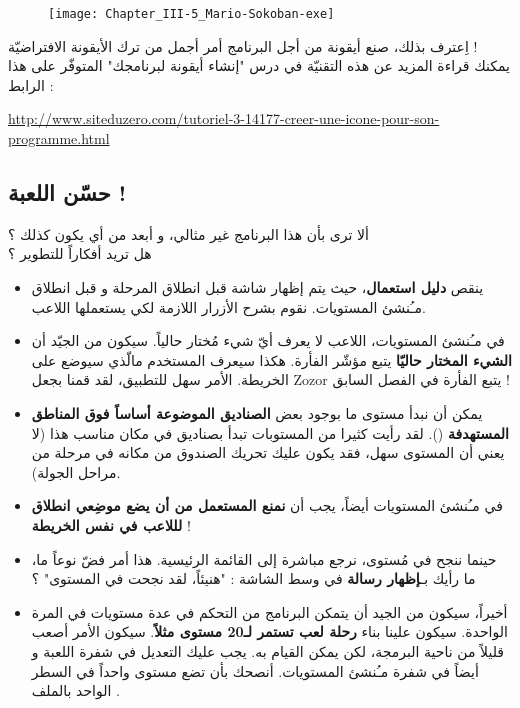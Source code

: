 \begin{figure}[H]
	\centering
	\texttt{[image: Chapter\_III-5\_Mario-Sokoban-exe]}
\end{figure}

اِعترف بذلك، صنع أيقونة من أجل البرنامج أمر أجمل من ترك الأيقونة الافتراضيّة !\\
يمكنك قراءة المزيد عن هذه التقنيّة في درس "إنشاء أيقونة لبرنامجك" المتوفّر على هذا الرابط :

\url{http://www.siteduzero.com/tutoriel-3-14177-creer-une-icone-pour-son-programme.html}

\subsection{حسّن اللعبة !}

ألا ترى بأن هذا البرنامج غير مثالي، و أبعد من أي يكون كذلك ؟\\
هل تريد أفكاراً للتطوير ؟

\begin{itemize}
	\item ينقص
	\textbf{دليل استعمال}،
	حيث يتم إظهار شاشة قبل انطلاق المرحلة و قبل انطلاق مـُنشئ المستويات. نقوم بشرح الأزرار اللازمة لكي يستعملها اللاعب.
	\item في مـُنشئ المستويات، اللاعب لا يعرف أيّ شيء مُختار حالياً. سيكون من الجيّد أن 
	\textbf{الشيء المختار حاليّا}
	يتبع مؤشّر الفأرة. هكذا سيعرف المستخدم مالّذي سيوضع على الخريطة. الأمر سهل للتطبيق، لقد قمنا بجعل
	\textenglish{Zozor}
	يتبع الفأرة في الفصل السابق !
	\item يمكن أن نبدأ مستوى ما بوجود بعض
	\textbf{الصناديق الموضوعة أساساً فوق المناطق المستهدفة}
	().
	لقد رأيت كثيرا من المستوبات تبدأ بصناديق في مكان مناسب هذا (لا يعني أن المستوى سهل، فقد يكون عليك تحريك الصندوق من مكانه في مرحلة من مراحل الجولة).
	\item في مـُنشئ المستويات أيضاً، يجب أن
	\textbf{نمنع المستعمل من أن يضع موضِعي انطلاق لللاعب في نفس الخريطة} !
	\item حينما ننجح في مُستوى، نرجع مباشرة إلى القائمة الرئيسية. هذا أمر فضّ نوعاً ما، ما رأيك بـ\textbf{إظهار رسالة}
	في وسط الشاشة : "هنيئاً، لقد نجحت في المستوى" ؟
	\item أخيراً، سيكون من الجيد أن يتمكن البرنامج من التحكم في عدة مستويات في المرة الواحدة. سيكون علينا بناء
	\textbf{رحلة لعب تستمر لـ20 مستوى مثلاً}.
	سيكون الأمر أصعب قليلاً من ناحية البرمجة، لكن يمكن القيام به. يجب عليك التعديل في شفرة اللعبة و أيضاً في شفرة مـُنشئ المستويات. أنصحك بأن تضع مستوى واحداً في السطر الواحد بالملف
	.
\end{itemize}

